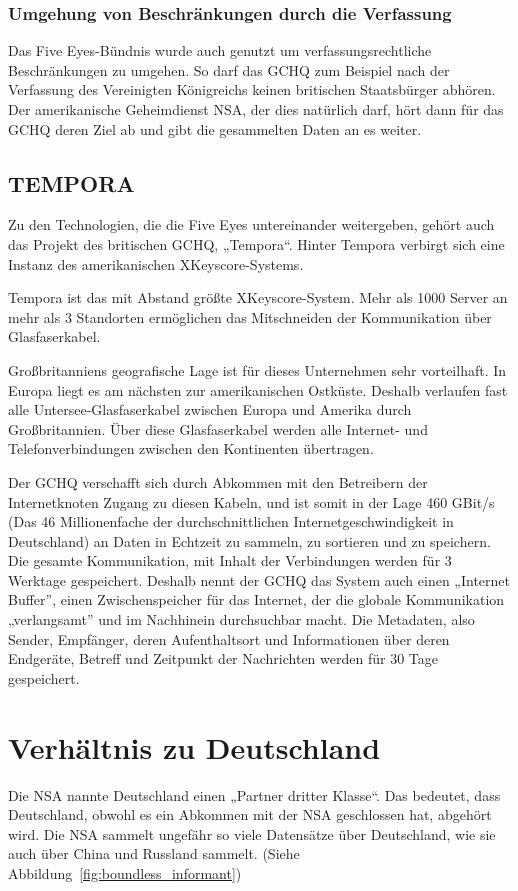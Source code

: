 \documentclass[12pt,a4paper]{scrartcl}
\begin{document}
\subsubsection{Umgehung von Beschränkungen durch die Verfassung}
Das Five Eyes-Bündnis wurde auch genutzt um verfassungsrechtliche Beschränkungen zu umgehen. So darf das GCHQ zum Beispiel nach der Verfassung des Vereinigten Königreichs keinen britischen Staatsbürger abhören. Der amerikanische Geheimdienst NSA, der dies natürlich darf, hört dann für das GCHQ deren Ziel ab und gibt die gesammelten Daten an es weiter.\cite{guardian_intentionalspy}

\subsection{TEMPORA}
Zu den Technologien, die die Five Eyes untereinander weitergeben, gehört auch das Projekt des britischen GCHQ, „Tempora“. Hinter Tempora verbirgt sich eine Instanz des amerikanischen XKeyscore-Systems.\cite{gchq_tempora}

Tempora ist das mit Abstand größte XKeyscore-System. Mehr als 1000 Server an mehr als 3 Standorten ermöglichen das Mitschneiden der Kommunikation über Glasfaserkabel.\cite{gchq_tempora}

Großbritanniens geografische Lage ist für dieses Unternehmen sehr vorteilhaft. In Europa liegt es am nächsten zur amerikanischen Ostküste. Deshalb verlaufen fast alle Untersee-Glasfaserkabel zwischen Europa und Amerika durch Großbritannien. Über diese Glasfaserkabel werden alle Internet- und Telefonverbindungen zwischen den Kontinenten übertragen.\cite{gchq_tempora}

Der GCHQ verschafft sich durch Abkommen mit den Betreibern der Internetknoten Zugang zu diesen Kabeln, und ist somit in der Lage 460 GBit/s\cite{gchq_tempora} (Das 46 Millionenfache der durchschnittlichen Internetgeschwindigkeit in Deutschland\cite{statista_internet}) an Daten in Echtzeit zu sammeln, zu sortieren und zu speichern. Die gesamte Kommunikation, mit Inhalt der Verbindungen werden für 3 Werktage gespeichert. Deshalb nennt der GCHQ das System auch einen „Internet Buffer”, einen Zwischenspeicher für das Internet, der die globale Kommunikation „verlangsamt” und im Nachhinein durchsuchbar macht.\cite{gchq_tempora} Die Metadaten, also Sender, Empfänger, deren Aufenthaltsort und Informationen über deren Endgeräte, Betreff und Zeitpunkt der Nachrichten werden für 30 Tage gespeichert.\cite{gchq_tempora}

\section{Verhältnis zu Deutschland}
Die NSA nannte Deutschland einen „Partner dritter Klasse“\cite{zeit_partner}. Das bedeutet, dass Deutschland, obwohl es ein Abkommen mit der NSA geschlossen hat, abgehört wird.\cite{zeit_partner} Die NSA sammelt ungefähr so viele Datensätze über Deutschland, wie sie auch über China und Russland sammelt. (Siehe Abbildung~\ref{fig:boundless_informant})
\end{document}
